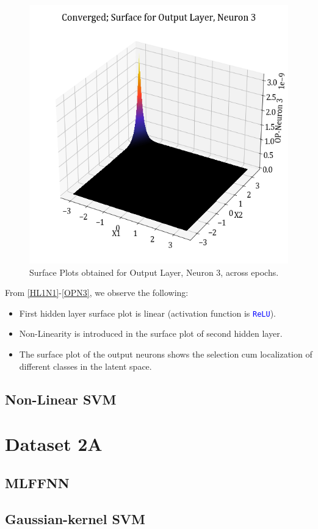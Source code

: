 \documentclass[11pt,a4paper]{article}
\newcommand{\noi}{\noindent}
\def\colortt#1{\textcolor{blue}{\texttt{#1}}}
\begin{document}
\begin{figure}[H]
    \includegraphics[scale=0.4]{images/1B_MLFFNN_conv_OP_N3.png}
    \caption{Surface Plots obtained for Output Layer, Neuron 3, across epochs.}
    \label{OPN3}
\end{figure}

\noi
From \autoref{HL1N1}-\autoref{OPN3}, we observe the following:
\begin{itemize}
    \itemsep0em 
    \item First hidden layer surface plot is linear (activation function is \colortt{ReLU}).
    \item Non-Linearity is introduced in the surface plot of second hidden layer.
    \item The surface plot of the output neurons shows the selection cum localization of different classes in the latent space.
\end{itemize}

\subsection{Non-Linear SVM}

\break
\section{Dataset 2A}
\subsection{MLFFNN}
\subsection{Gaussian-kernel SVM}
\end{document}

